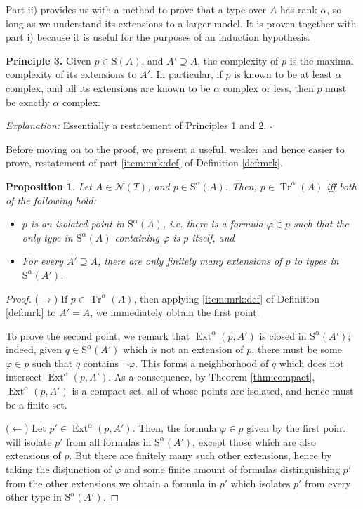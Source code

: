 \documentclass{article}
\newtheorem{prop}[theorem]{Proposition}
\theoremstyle{nonumberplain}
\newtheorem{proof}{Proof}
\newcommand{\calN}{\mathcal{N}}
\newcommand{\Stone}{\mathrm{S}}
\DeclareMathOperator{\Tr}{Tr}
\DeclareMathOperator{\Ext}{Ext}
\begin{document}
Part ii) provides us with a method to prove that a type over $A$ has rank $\alpha$, so long as we understand its extensions to a larger model. It is proven together with part i) because it is useful for the purposes of an induction hypothesis.

\medskip

\textbf{Principle 3.} Given $p \in \Stone(A)$, and $A' \supseteq A$, the complexity of $p$ is the maximal complexity of its extensions to $A'$. In particular, if $p$ is known to be at least $\alpha$ complex, and all its extensions are known to be $\alpha$ complex or less, then $p$ must be exactly $\alpha$ complex.

\smallskip

\textit{Explanation:} Essentially a restatement of Principles 1 and 2. \hfill $\square$

\medskip

Before moving on to the proof, we present a useful, weaker and hence easier to prove, restatement of part \ref{item:mrk:def} of Definition \ref{def:mrk}.

\begin{prop}\label{prop:altv}
Let $A \in \calN(T)$, and $p \in \Stone^\alpha(A)$. Then, $p \in \Tr^\alpha(A)$ iff both of the following hold:
\begin{itemize}
\item $p$ is an isolated point in $\Stone^\alpha(A)$, i.e. there is a formula $\varphi \in p$ such that the only type in $\Stone^\alpha(A)$ containing $\varphi$ is $p$ itself, and
\item For every $A' \supseteq A$, there are only finitely many extensions of $p$ to types in $\Stone^\alpha(A')$.
\end{itemize}
\end{prop}

\begin{proof}
($\rightarrow$) If $p \in \Tr^\alpha(A)$, then applying \ref{item:mrk:def} of Definition \ref{def:mrk} to $A' = A$, we immediately obtain the first point.

To prove the second point, we remark that $\Ext^\alpha(p,A')$ is closed in $\Stone^\alpha(A')$; indeed, given $q \in \Stone^\alpha(A')$ which is not an extension of $p$, there must be some $\varphi \in p$ such that $q$ contains $\neg\varphi$. This forms a neighborhood of $q$ which does not intersect $\Ext^\alpha(p,A')$. As a consequence, by Theorem \ref{thm:compact}, $\Ext^\alpha(p,A')$ is a compact set, all of whose points are isolated, and hence must be a finite set.

\smallskip

($\leftarrow$) Let $p' \in \Ext^\alpha(p,A')$. Then, the formula $\varphi \in p$ given by the first point will isolate $p'$ from all formulas in $\Stone^\alpha(A')$, except those which are also extensions of $p$. But there are finitely many such other extensions, hence by taking the disjunction of $\varphi$ and some finite amount of formulas distinguishing $p'$ from the other extensions we obtain a formula in $p'$ which isolates $p'$ from every other type in $\Stone^\alpha(A')$.
\end{proof}
\end{document}

